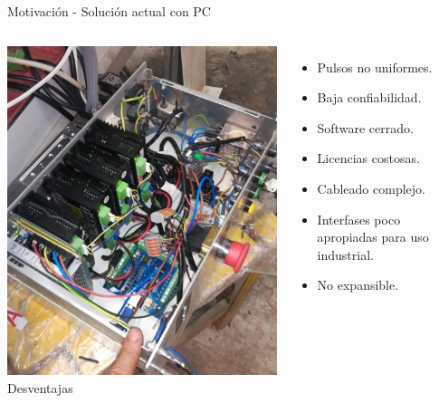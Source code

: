 \documentclass[aspectratio= 43]{beamer}
\begin{document}
\begin{frame}{Motivación - Solución actual con PC}
   \begin{columns}
      \includegraphics[width=\textwidth]{./Figures/tripas_wolfcut.jpg}
      Desventajas
      \begin{itemize}
         \item{Pulsos no uniformes.}
         \item{Baja confiabilidad.}
         \item{Software cerrado.}
         \item{Licencias costosas.}
         \item{Cableado complejo.}
         \item{Interfases poco apropiadas para uso industrial.}
         \item{No expansible.}
      \end{itemize}
   \end{columns}
\end{frame}
\end{document}

